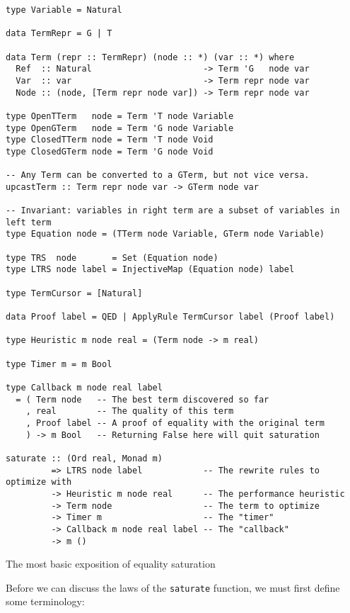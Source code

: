 \documentclass[11pt]{report}
\newcommand{\haskell}[1]{\texttt{#1}}
\begin{document}
\begin{listing}[ht]
\begin{verbatim}
type Variable = Natural

data TermRepr = G | T

data Term (repr :: TermRepr) (node :: *) (var :: *) where
  Ref  :: Natural                      -> Term 'G   node var
  Var  :: var                          -> Term repr node var
  Node :: (node, [Term repr node var]) -> Term repr node var

type OpenTTerm   node = Term 'T node Variable
type OpenGTerm   node = Term 'G node Variable
type ClosedTTerm node = Term 'T node Void
type ClosedGTerm node = Term 'G node Void

-- Any Term can be converted to a GTerm, but not vice versa.
upcastTerm :: Term repr node var -> GTerm node var

-- Invariant: variables in right term are a subset of variables in left term
type Equation node = (TTerm node Variable, GTerm node Variable)

type TRS  node       = Set (Equation node)
type LTRS node label = InjectiveMap (Equation node) label

type TermCursor = [Natural]

data Proof label = QED | ApplyRule TermCursor label (Proof label)

type Heuristic m node real = (Term node -> m real)

type Timer m = m Bool

type Callback m node real label
  = ( Term node   -- The best term discovered so far
    , real        -- The quality of this term
    , Proof label -- A proof of equality with the original term
    ) -> m Bool   -- Returning False here will quit saturation

saturate :: (Ord real, Monad m)
         => LTRS node label            -- The rewrite rules to optimize with
         -> Heuristic m node real      -- The performance heuristic
         -> Term node                  -- The term to optimize
         -> Timer m                    -- The "timer"
         -> Callback m node real label -- The "callback"
         -> m ()
\end{verbatim}
\caption{The most basic exposition of equality saturation}
\label{lst:basic-eqsat}
\end{listing}

\vspace{2.5em}

Before we can discuss the laws of the \haskell{saturate} function, we must first
define some terminology:
\end{document}
